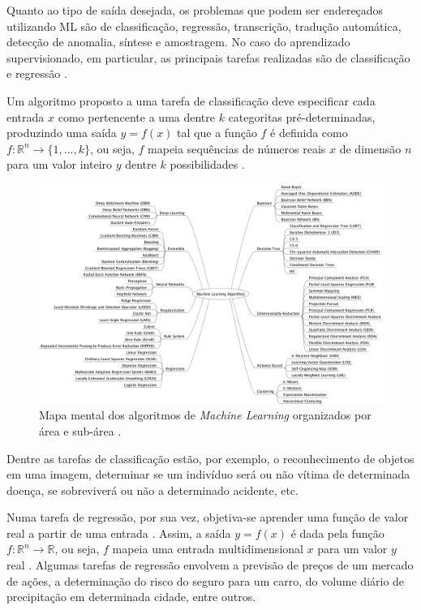Quanto ao tipo de saída desejada, os problemas que podem ser endereçados utilizando ML são de classificação, regressão, transcrição, tradução automática, detecção de anomalia, síntese e amostragem. No caso do aprendizado supervisionado, em particular, as principais tarefas realizadas são de classificação e regressão \cite{flach2012machine}.

Um algoritmo proposto a uma tarefa de classificação deve especificar cada entrada $x$ como pertencente a uma dentre $k$ categoritas pré-determinadas, produzindo uma saída $y=f(x)$ tal que a função $f$ é definida como $f: \mathds{R}^n \rightarrow \{1, \ldots, k\}$, ou seja, $f$ mapeia sequências de números reais  $x$ de dimensão $n$ para um valor inteiro $y$ dentre $k$ possibilidades \cite{goodfellow2016deep}.
\clearpage
\begin{figure}
	\includegraphics[width=\linewidth]{img/machinelearningalgorithms.png}
	\caption{Mapa mental dos algoritmos de \emph{Machine Learning} organizados por área e sub-área \cite{ml:algos}.}\label{fig:ml_algorithms}
\end{figure}
\clearpage Dentre as tarefas de classificação estão, por exemplo, o reconhecimento de objetos em uma imagem, determinar se um indivíduo será ou não vítima de determinada doença, se sobreviverá ou não a determinado acidente, etc.

Numa tarefa de regressão, por sua vez, objetiva-se aprender uma função de valor real a partir de uma entrada \cite{flach2012machine}. Assim, a saída $y=f(x)$ é dada pela função $f: \mathds{R}^n \rightarrow \mathds{R}$, ou seja, $f$ mapeia uma entrada multidimensional $x$ para um valor $y$ real \cite{goodfellow2016deep}. Algumas tarefas de regressão envolvem a previsão de preços de um mercado de ações, a determinação do risco do seguro para um carro, do volume diário de precipitação em determinada cidade, entre outros.

